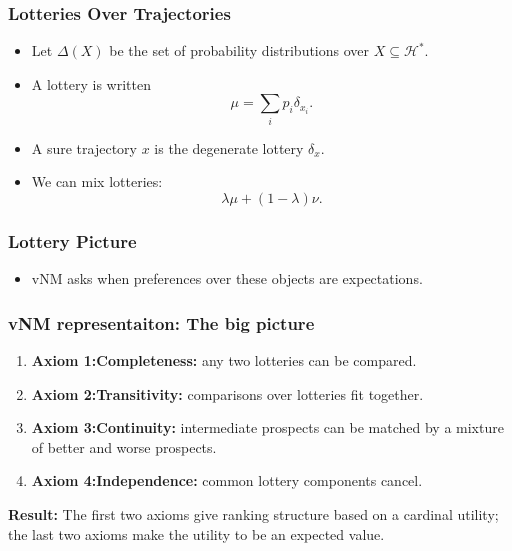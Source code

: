 \documentclass[10pt,a4paper]{beamer}
\newcommand{\Hcal}{\mathcal{H}}
\newcommand{\Lot}{\Delta}
\begin{document}
\begin{frame}
\frametitle{Lotteries Over Trajectories}
\begin{itemize}
    \item Let $\Lot(X)$ be the set of probability distributions over
    $X\subseteq \Hcal^*$.
    \pause
    \item A lottery is written
    $$
    \mu=\sum_i p_i\delta_{x_i}.
    $$
    \pause
    \item A sure trajectory $x$ is the degenerate lottery $\delta_x$.
    \pause
    \item We can mix lotteries:
    $$
    \lambda\mu+(1-\lambda)\nu.
    $$
\end{itemize}
\end{frame}

\begin{frame}
\frametitle{Lottery Picture}
\centering
{}

\vspace{0.55cm}
\begin{itemize}
    \item vNM asks when preferences over these objects are expectations.
\end{itemize}
\end{frame}

\begin{frame}
\frametitle{vNM representaiton: The big picture}
\begin{enumerate}
    \item \textbf{Axiom 1:Completeness:} any two lotteries can be compared.
    \pause
    \item \textbf{Axiom 2:Transitivity:} comparisons over lotteries fit together.
    \pause
    \item \textbf{Axiom 3:Continuity:} intermediate prospects can be matched by a
    mixture of better and worse prospects.
    \pause
    \item \textbf{Axiom 4:Independence:} common lottery components cancel.
\end{enumerate}

\pause
\vspace{0.25cm}
\textbf{Result:} 
The first two axioms give ranking structure based on a cardinal utility; 
the last two axioms make the utility to be an expected value.
\end{frame}
\end{document}
